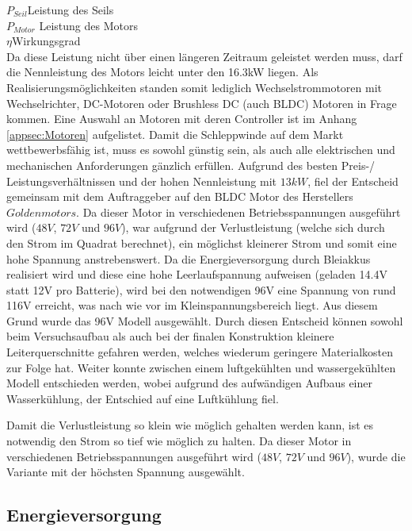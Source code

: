 $ P_{Seil} $\quad 	Leistung des Seils     \\
$ P_{Motor} $  Leistung des Motors    \\
$ \eta $\qquad  Wirkungsgrad     \\

Da diese Leistung nicht über einen längeren Zeitraum geleistet werden muss, darf die Nennleistung des Motors leicht unter den 16.3kW liegen. Als Realisierungsmöglichkeiten standen somit lediglich Wechselstrommotoren mit Wechselrichter, DC-Motoren oder Brushless DC (auch BLDC) Motoren in Frage kommen. Eine Auswahl an Motoren mit deren Controller ist im Anhang \ref{appsec:Motoren} aufgelistet.
Damit die Schleppwinde auf dem Markt wettbewerbsfähig ist, muss es sowohl günstig sein, als auch alle elektrischen und mechanischen Anforderungen gänzlich erfüllen. Aufgrund des besten Preis-/ Leistungsverhältnissen und der hohen Nennleistung mit $ 13kW $, fiel der Entscheid gemeinsam mit dem Auftraggeber auf den BLDC Motor des Herstellers $ Goldenmotors $. Da dieser Motor in verschiedenen Betriebsspannungen ausgeführt wird ($ 48V $, $ 72V $ und $ 96V $), war aufgrund der Verlustleistung (welche sich durch den Strom im Quadrat berechnet), ein möglichst kleinerer Strom und somit eine hohe Spannung anstrebenswert. Da die Energieversorgung durch Bleiakkus realisiert wird und diese eine hohe Leerlaufspannung aufweisen (geladen 14.4V statt 12V pro Batterie), wird bei den notwendigen 96V eine Spannung von rund 116V erreicht, was nach wie vor im Kleinspannungsbereich liegt. Aus diesem Grund wurde das 96V Modell ausgewählt. Durch diesen Entscheid können sowohl beim Versuchsaufbau als auch bei der finalen Konstruktion kleinere Leiterquerschnitte gefahren werden, welches wiederum geringere Materialkosten zur Folge hat. Weiter konnte zwischen einem luftgekühlten und wassergekühlten Modell entschieden werden, wobei aufgrund des aufwändigen Aufbaus einer Wasserkühlung, der Entschied auf eine Luftkühlung fiel.  

Damit die Verlustleistung so klein wie möglich gehalten werden kann, ist es notwendig den Strom so tief wie möglich zu halten. Da dieser Motor in verschiedenen Betriebsspannungen ausgeführt wird ($ 48V $, $ 72V $ und $ 96V $), wurde die Variante mit der höchsten Spannung ausgewählt. 

\subsection{Energieversorgung}\label{subsec:Energieversorgung}

